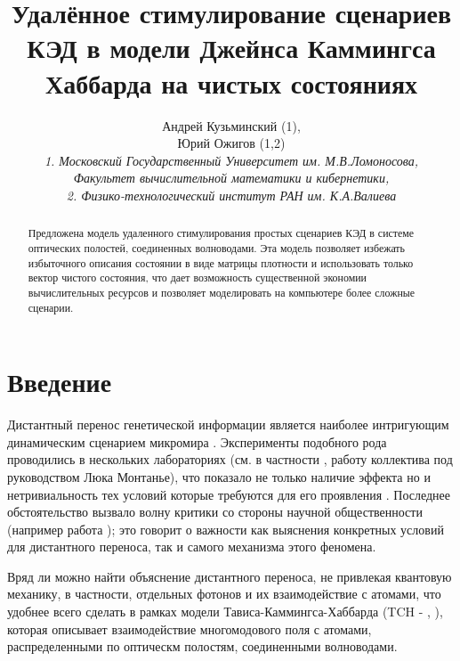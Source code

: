 \documentclass[12pt]{article}
\begin{document}
\title{Удалённое стимулирование сценариев  КЭД в модели Джейнса Каммингса Хаббарда на чистых состояниях }

\author{Андрей Кузьминский (1),\\  Юрий Ожигов (1,2)\\
{\it 
1. Московский Государственный Университет им. М.В.Ломоносова, 
} \\
{\it Факультет вычислительной математики и кибернетики,}
\\
{\it 2. Физико-технологический институт РАН им. К.А.Валиева}
\\ 
}
\maketitle

\begin{abstract}
Предложена модель удаленного стимулирования простых сценариев КЭД в системе оптических полостей, соединенных волноводами. Эта модель позволяет избежать избыточного описания состоянии в виде матрицы плотности и использовать только вектор чистого состояния, что дает возможность существенной экономии вычислительных ресурсов и позволяет моделировать на компьютере более сложные сценарии. 

\end{abstract}
\newpage

\section{Введение}
Дистантный перенос генетической информации является наиболее интригующим динамическим сценарием микромира . Эксперименты подобного рода проводились в нескольких лабораториях (см. в частности , работу \cite{mont} коллектива под руководством Люка Монтанье), что показало не только наличие эффекта но и нетривиальность тех условий которые требуются для его проявления . Последнее обстоятельство вызвало волну критики со стороны научной общественности (например работа  \cite{scept}); это говорит о важности как выяснения конкретных условий для дистантного переноса, так и самого механизма этого феномена. 

Вряд ли можно найти объяснение дистантного переноса, не привлекая квантовую механику, в частности, отдельных фотонов и их взаимодействие с атомами, что удобнее всего сделать в рамках модели Тависа-Каммингса-Хаббарда (TCH - \cite{TC}, \cite{T}), которая описывает взаимодействие многомодового поля с атомами, распределенными по оптическм полостям, соединенными волноводами.
\end{document}
